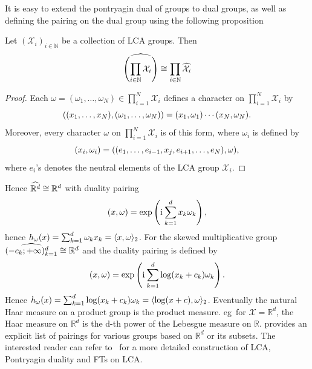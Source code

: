 It is easy to extend the pontryagin dual of groups to dual groups, as well as
defining the pairing on the dual group using the following
proposition~\citep{folland1994course}
\begin{proposition}
    Let $(\mathcal{X}_i)_{i\in\mathbb{N}}$ be a collection of \ac{LCA} groups.
    Then
    \begin{dmath*}
        \dual{\left(\prod_{i\in\mathbb{N}} \mathcal{X}_i\right)} \cong
        \prod_{i\in\mathbb{N}} \dual{\mathcal{X}_i}
    \end{dmath*}
\end{proposition}
\begin{proof}
    Each $\omega=(\omega_1, \hdots, \omega_N)\in\prod_{i=1}^N\mathcal{X}_i$
    defines a character on $\prod_{i=1}^N\mathcal{X}_i$ by
    \begin{dmath*}
        \pairing{(x_1, \hdots, x_N),(\omega_1, \hdots,
        \omega_N)}=\pairing{x_1,\omega_1}\cdots\pairing{x_N,\omega_N}.
    \end{dmath*}
    Moreover, every character $\omega$ on $\prod_{i=1}^N\mathcal{X}_i$ is of
    this form, where $\omega_i$ is defined by
    \begin{dmath*}
        \pairing{x_i,\omega_i}=\pairing{(e_1, \hdots, e_{i-1}, x_j, e_{i+1},
        \hdots, e_N), \omega},
    \end{dmath*}
    where $e_i$'s denotes the neutral elements of the \ac{LCA} group
    $\mathcal{X}_i$.
\end{proof}
Hence $\widehat{\mathbb{R}^d}\cong\mathbb{R}^d$ with duality pairing
\begin{dmath*}
    \pairing{x,\omega}=\exp\left(\iu\sum_{k=1}^d x_k\omega_k \right),
\end{dmath*}
hence $h_\omega(x)=\sum_{k=1}^d\omega_k x_k=\langle x,\omega\rangle_2$. For the
skewed multiplicative group $\widehat{(-c_k;+\infty)_{k=1}^d}\cong\mathbb{R}^d$
and the duality pairing is defined by
\begin{dmath*}
    \label{eq:pairing-skewed} \pairing{x, \omega} =
    \exp\left(\iu\sum_{k=1}^d\log(x_k+c_k)\omega_k\right).
\end{dmath*}
Hence $h_\omega(x)=\sum_{k=1}^d
\log(x_k+c_k)\omega_k=\langle\log(x+c),\omega\rangle_2$. Eventually the natural Haar
measure on a product group is the product measure. \acs{eg}~for
$\mathcal{X}=\mathbb{R}^d$, the Haar measure on $\mathbb{R}^d$ is the d-th
power of the Lebesgue measure on $\mathbb{R}$. 
provides an explicit list of pairings for various groups based on
$\mathbb{R}^d$ or its subsets. The interested reader can refer
to~\citet{folland1994course} for a more detailed construction of \ac{LCA},
Pontryagin duality and \acl{FT}s on \ac{LCA}.

